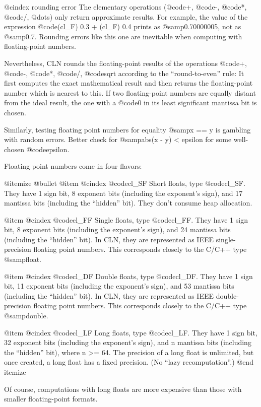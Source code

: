 @cindex rounding error
The elementary operations (@code{+}, @code{-}, @code{*}, @code{/}, @dots{})
only return approximate results. For example, the value of the expression
@code{(cl_F) 0.3 + (cl_F) 0.4} prints as @samp{0.70000005}, not as
@samp{0.7}. Rounding errors like this one are inevitable when computing
with floating-point numbers.

Nevertheless, CLN rounds the floating-point results of the operations @code{+},
@code{-}, @code{*}, @code{/}, @code{sqrt} according to the ``round-to-even''
rule: It first computes the exact mathematical result and then returns the
floating-point number which is nearest to this. If two floating-point numbers
are equally distant from the ideal result, the one with a @code{0} in its least
significant mantissa bit is chosen.

Similarly, testing floating point numbers for equality @samp{x == y}
is gambling with random errors. Better check for @samp{abs(x - y) < epsilon}
for some well-chosen @code{epsilon}.

Floating point numbers come in four flavors:

@itemize @bullet
@item
@cindex @code{cl_SF}
Short floats, type @code{cl_SF}.
They have 1 sign bit, 8 exponent bits (including the exponent's sign),
and 17 mantissa bits (including the ``hidden'' bit).
They don't consume heap allocation.

@item
@cindex @code{cl_FF}
Single floats, type @code{cl_FF}.
They have 1 sign bit, 8 exponent bits (including the exponent's sign),
and 24 mantissa bits (including the ``hidden'' bit).
In CLN, they are represented as IEEE single-precision floating point numbers.
This corresponds closely to the C/C++ type @samp{float}.

@item
@cindex @code{cl_DF}
Double floats, type @code{cl_DF}.
They have 1 sign bit, 11 exponent bits (including the exponent's sign),
and 53 mantissa bits (including the ``hidden'' bit).
In CLN, they are represented as IEEE double-precision floating point numbers.
This corresponds closely to the C/C++ type @samp{double}.

@item
@cindex @code{cl_LF}
Long floats, type @code{cl_LF}.
They have 1 sign bit, 32 exponent bits (including the exponent's sign),
and n mantissa bits (including the ``hidden'' bit), where n >= 64.
The precision of a long float is unlimited, but once created, a long float
has a fixed precision. (No ``lazy recomputation''.)
@end itemize

Of course, computations with long floats are more expensive than those
with smaller floating-point formats.

